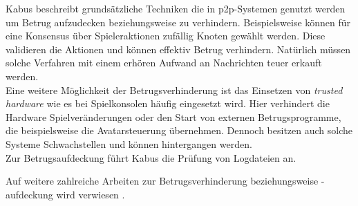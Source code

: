 Kabus \cite{Kabus2005Addressing} beschreibt grundsätzliche Techniken die in p2p-Systemen genutzt werden um Betrug aufzudecken beziehungsweise zu verhindern. Beispielsweise können für eine Konsensus über Spieleraktionen zufällig Knoten gewählt werden. Diese validieren die Aktionen und können effektiv Betrug verhindern. Natürlich müssen solche Verfahren mit einem erhören Aufwand an Nachrichten teuer erkauft werden.\\
Eine weitere Möglichkeit der Betrugsverhinderung ist das Einsetzen von \emph{trusted hardware} wie es bei Spielkonsolen häufig eingesetzt wird. Hier verhindert die Hardware Spielveränderungen oder den Start von externen Betrugsprogramme, die beispielsweise die Avatarsteuerung übernehmen. Dennoch besitzen auch solche Systeme Schwachstellen und können hintergangen werden.\\
Zur Betrugsaufdeckung führt Kabus die Prüfung von Logdateien an.

Auf weitere zahlreiche Arbeiten zur Betrugsverhinderung beziehungsweise -aufdeckung wird verwiesen \cite{Ferretti2008Cheating, Gauthierdickey2004Low, Kabus2007Design, Dautermann2007, Kabus2009, Castro2002Secure}.
